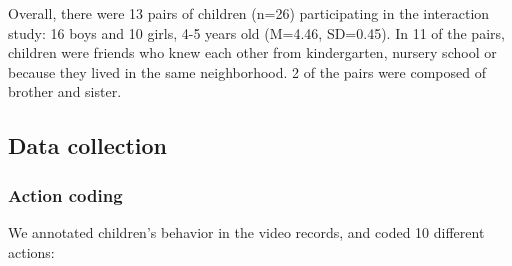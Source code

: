 \documentclass{sig-alternate}
\begin{document}
Overall, there were 13 pairs of children (n=26) participating in the interaction
study: 16 boys and 10 girls, 4-5 years old (M=4.46, SD=0.45). In 11 of the
pairs, children were friends who knew each other from kindergarten, nursery
school or because they lived in the same neighborhood. 2 of the pairs were
composed of brother and sister.



\subsection{Data collection}
\subsubsection{Action coding}

We annotated children's behavior in the video records, and coded 10 different
actions:
\end{document}
